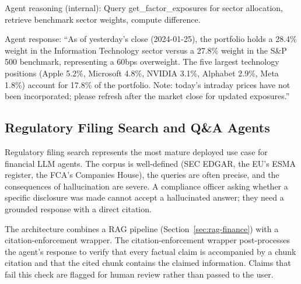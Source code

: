 \begin{context}
\begin{example}
Agent reasoning (internal): Query get\_factor\_exposures for sector allocation,
retrieve benchmark sector weights, compute difference.

Agent response: ``As of yesterday's close (2024-01-25), the portfolio holds a 28.4\%
weight in the Information Technology sector versus a 27.8\% weight in the S\&P 500
benchmark, representing a 60bps overweight. The five largest technology positions
(Apple 5.2\%, Microsoft 4.8\%, NVIDIA 3.1\%, Alphabet 2.9\%, Meta 1.8\%) account for
17.8\% of the portfolio. Note: today's intraday prices have not been incorporated;
please refresh after the market close for updated exposures.''
\end{example}


\subsection{Regulatory Filing Search and Q\&A Agents}
\label{subsec:filing-search}

Regulatory filing search represents the most mature deployed use case for financial
LLM agents. The corpus is well-defined (SEC EDGAR, the EU's ESMA register, the FCA's
Companies House), the queries are often precise, and the consequences of hallucination
are severe. A compliance officer asking whether a specific disclosure was made cannot
accept a hallucinated answer; they need a grounded response with a direct citation.

The architecture combines a RAG pipeline (Section~\ref{sec:rag-finance}) with a
citation-enforcement wrapper. The citation-enforcement wrapper post-processes the
agent's response to verify that every factual claim is accompanied by a chunk citation
and that the cited chunk contains the claimed information. Claims that fail this check
are flagged for human review rather than passed to the user.


\end{context}
